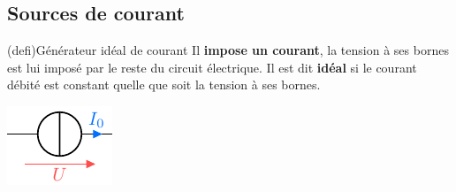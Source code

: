 \documentclass[../../main/main.tex]{subfiles}
\begin{document}
\subsection{Sources de courant}

\begin{tcb*}[label=def:gentens, sidebyside, righthand ratio=.2](defi){Générateur
			idéal de courant}
	Il \textbf{impose un courant}, la tension à ses bornes est lui imposé par le
	reste du circuit électrique. Il est dit \textbf{idéal} si le courant débité
	est constant quelle que soit la tension à ses bornes.
	\tcblower
	\begin{center}
		\includegraphics[width=.8\linewidth]{gcourg}
	\end{center}
\end{tcb*}
\end{document}
